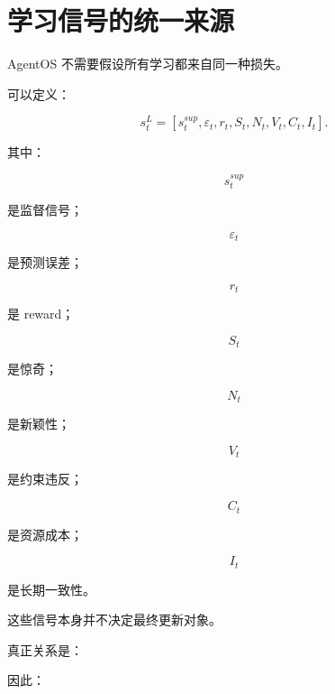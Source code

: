 \begin{statementbox}
\centering
{}
\end{statementbox}

\begin{statementbox}
\centering
{}
\end{statementbox}


\section{学习信号的统一来源}

AgentOS 不需要假设所有学习都来自同一种损失。

可以定义：

\[
\boxed{
s_t^L
=
[
s_t^{sup},
\varepsilon_t,
r_t,
S_t,
N_t,
V_t,
C_t,
I_t
].
}
\]

其中：

\[
s_t^{sup}
\]

是监督信号；

\[
\varepsilon_t
\]

是预测误差；

\[
r_t
\]

是 reward；

\[
S_t
\]

是惊奇；

\[
N_t
\]

是新颖性；

\[
V_t
\]

是约束违反；

\[
C_t
\]

是资源成本；

\[
I_t
\]

是长期一致性。

这些信号本身并不决定最终更新对象。

真正关系是：

\begin{statementbox}
\centering
{}
\end{statementbox}

因此：

\begin{statementbox}
\centering
{}
\end{statementbox}

